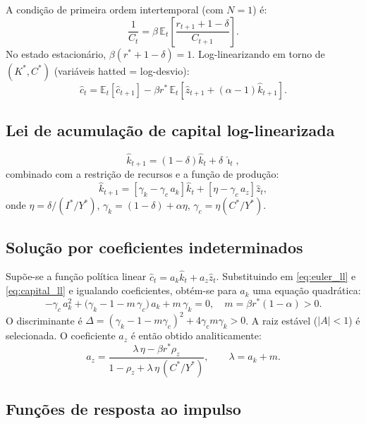 \documentclass[11pt,a4paper]{article}
\newcommand{\E}{\mathbb{E}}
\newcommand{\hk}{\hat{k}}
\newcommand{\hz}{\hat{z}}
\newcommand{\hc}{\hat{c}}
\newcommand{\hi}{\hat{\imath}}
\begin{document}
A condição de primeira ordem intertemporal (com $N=1$) é:
\[
  \frac{1}{C_t} = \beta\,\E_t\!\left[\frac{r_{t+1}+1-\delta}{C_{t+1}}\right].
\]
No estado estacionário, $\beta(r^*+1-\delta)=1$.
Log-linearizando em torno de $(K^*,C^*)$ (variáveis hatted = log-desvio):
\begin{equation}\label{eq:euler_ll}
  \hc_t = \E_t[\hc_{t+1}] - \beta r^*\,\E_t\!\left[\hz_{t+1} + (\alpha-1)\hk_{t+1}\right].
\end{equation}

\subsection{Lei de acumulação de capital log-linearizada}

\[
  \hk_{t+1} = (1-\delta)\hk_t + \delta\,\hi_t,
\]
combinado com a restrição de recursos e a função de produção:
\begin{equation}\label{eq:capital_ll}
  \hk_{t+1} = \left[\gamma_k - \gamma_c\,a_k\right]\hk_t
             + \left[\eta - \gamma_c\,a_z\right]\hz_t,
\end{equation}
onde $\eta = \delta/(I^*/Y^*)$, $\gamma_k = (1-\delta)+\alpha\eta$,
$\gamma_c = \eta(C^*/Y^*)$.

\subsection{Solução por coeficientes indeterminados}

Supõe-se a função política linear $\hc_t = a_k\hk_t + a_z\hz_t$.
Substituindo em \eqref{eq:euler_ll} e \eqref{eq:capital_ll} e igualando
coeficientes, obtém-se para $a_k$ uma equação quadrática:
\begin{equation}\label{eq:quadratic}
  -\gamma_c\,a_k^2
  + \bigl(\gamma_k - 1 - m\,\gamma_c\bigr)\,a_k
  + m\,\gamma_k = 0,
  \quad m = \beta r^*(1-\alpha) > 0.
\end{equation}
O discriminante é $\Delta = (\gamma_k-1-m\gamma_c)^2 + 4\gamma_c m\gamma_k > 0$.
A raiz estável ($|A|<1$) é selecionada.
O coeficiente $a_z$ é então obtido analiticamente:
\begin{equation}
  a_z = \frac{\lambda\,\eta - \beta r^*\rho_z}{1 - \rho_z + \lambda\,\eta\,(C^*/Y^*)},
  \qquad \lambda = a_k + m.
\end{equation}

\subsection{Funções de resposta ao impulso}
\end{document}
